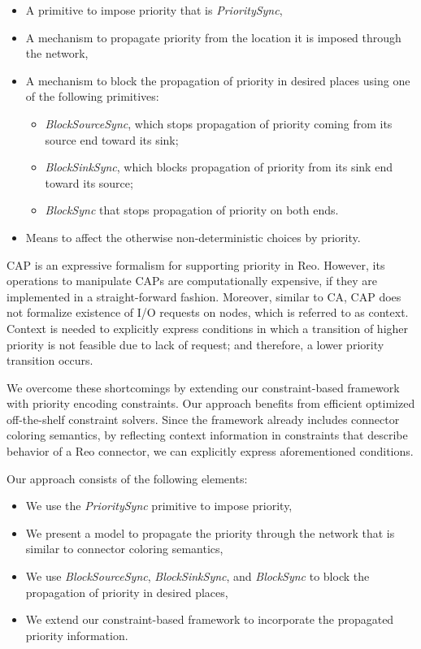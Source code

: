 \begin{itemize}
 \item A primitive to impose priority that is \emph{PrioritySync},
 \item A mechanism to propagate priority from the location it is imposed through the network,
 \item A mechanism to block the propagation of priority in desired places using one of the following primitives:  
 \begin{itemize}
 \item \emph{BlockSourceSync}, which stops propagation of priority coming from its source end toward its sink;
 \item \emph{BlockSinkSync}, which blocks propagation of priority from its sink end toward its source; 
 \item \emph{BlockSync} that stops propagation of priority on both ends.
 \end{itemize}
\item Means to affect the otherwise non-deterministic choices by priority.
\label{item:prioreq}
\end{itemize}

CAP is an expressive formalism for supporting priority in Reo. However, its operations to manipulate CAPs are computationally expensive, if they are implemented in a straight-forward fashion. Moreover, similar to CA, CAP does not formalize existence of I/O requests on nodes, which is referred to as context. Context is needed to explicitly express conditions in which a transition of higher priority is not feasible due to lack of request; and therefore, a lower priority transition occurs.   

We overcome these shortcomings by extending our constraint-based framework with priority encoding constraints. Our approach %
 benefits from efficient optimized off-the-shelf constraint solvers. Since the framework already includes connector coloring semantics, by reflecting context information in constraints that describe behavior of a Reo connector, we can explicitly express aforementioned conditions. %
 
Our approach consists of the following elements:
 
 \begin{itemize}
 	\item We use the \emph{PrioritySync} primitive to impose priority, 
 	\item We present a model to propagate the priority through the network that is similar to connector coloring semantics,
 	\item We use \emph{BlockSourceSync}, \emph{BlockSinkSync}, and \emph{BlockSync} to block the propagation of priority in desired places,
	\item We extend our constraint-based framework to incorporate the propagated priority information.
 \end{itemize}
 
